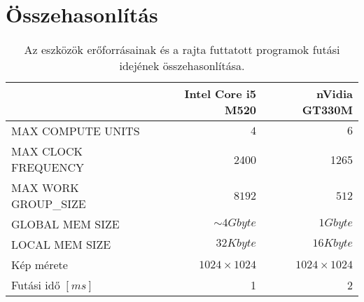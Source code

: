 \chapter{Összehasonlítás}

	\begin{table}[!ht]
	\footnotesize
	\centering
	\caption[Eszközök futási idejének összehasonlítása]{Az eszközök erőforrásainak és a rajta futtatott
	programok futási idejének összehasonlítása.}
	\label{table:results}
	\setlength{\extrarowheight}{8pt}
	\begin{tabular}{ l | r | r}
		 & Intel Core i5 M520 & nVidia GT330M \\ \hline
		MAX COMPUTE UNITS & $4$ & $6$\\
		MAX CLOCK FREQUENCY & 2400 & 1265 \\
		MAX WORK GROUP\_SIZE & $8192$ & $512$ \\ \hline\hline
		GLOBAL MEM SIZE & $\sim 4Gbyte$ & $1Gbyte$\\
		LOCAL MEM SIZE & $32 Kbyte$ & $16 Kbyte$\\ \hline\hline
		Kép mérete & $1024\times 1024$ & $1024\times 1024$ \\ 
		Futási idő $[ms]$ & 1 & 2
	\end{tabular}
	\end{table}



